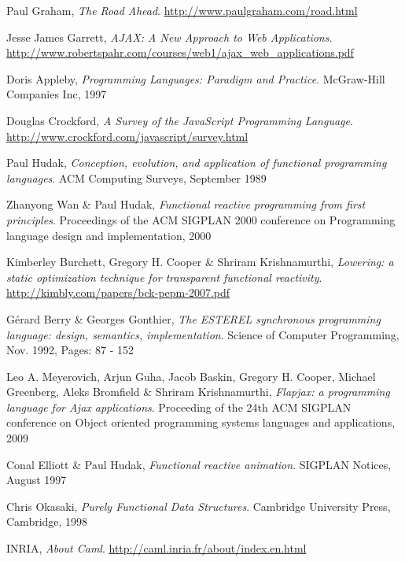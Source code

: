 \clearpage
{}
\begin{thebibliography}{99}

Paul Graham,
\emph{The Road Ahead}.
\url{http://www.paulgraham.com/road.html}

Jesse James Garrett,
\emph{AJAX: A New Approach to Web Applications}.
\url{http://www.robertspahr.com/courses/web1/ajax_web_applications.pdf}

Doris Appleby,
\emph{Programming Languages: Paradigm and Practice}.
McGraw-Hill Companies Inc,
1997

Douglas Crockford,
\emph{A Survey of the JavaScript Programming Language}.
\url{http://www.crockford.com/javascript/survey.html}

Paul Hudak,
\emph{Conception, evolution, and application of functional programming languages}.
ACM Computing Surveys,
September 1989

Zhanyong Wan \& Paul Hudak,
\emph{Functional reactive programming from first principles}.
Proceedings of the ACM SIGPLAN 2000 conference on Programming language design and implementation,
2000

Kimberley Burchett, Gregory H. Cooper \& Shriram Krishnamurthi,
\emph{Lowering: a static optimization technique for transparent functional reactivity}.
\url{http://kimbly.com/papers/bck-pepm-2007.pdf}

Gérard Berry \& Georges Gonthier,
\emph{The ESTEREL synchronous programming language: design, semantics, implementation}.
Science of Computer Programming,
Nov. 1992,
Pages: 87 - 152

Leo A. Meyerovich, Arjun Guha, Jacob Baskin, Gregory H. Cooper, Michael Greenberg, Aleks Bromfield \& Shriram Krishnamurthi,
\emph{Flapjax: a programming language for Ajax applications}.
Proceeding of the 24th ACM SIGPLAN conference on Object oriented programming systems languages and applications,
2009

Conal Elliott \& Paul Hudak,
\emph{Functional reactive animation}.
SIGPLAN Notices,
August 1997

Chris Okasaki,
\emph{Purely Functional Data Structures}.
Cambridge University Press, Cambridge,
1998

INRIA,
\emph{About Caml}.
\url{http://caml.inria.fr/about/index.en.html}


\end{thebibliography}

